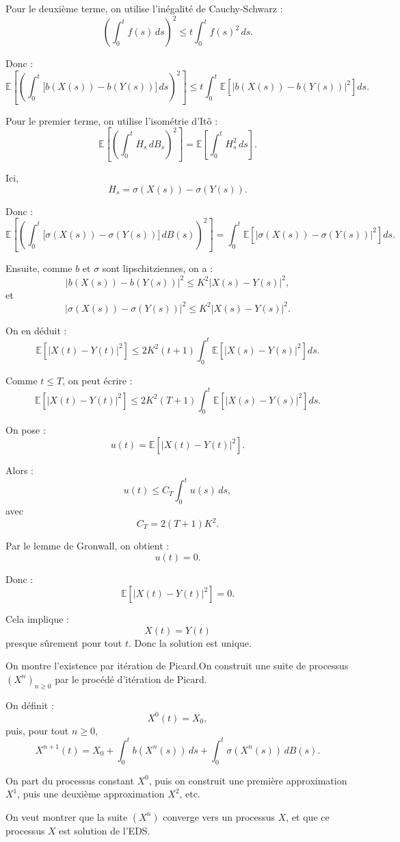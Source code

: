 \documentclass[12pt,a4paper]{article}
\theoremstyle{remark}
\begin{document}
Pour le deuxième terme, on utilise l’inégalité de Cauchy-Schwarz :
\[
\left(
\int_0^t f(s)\,ds
\right)^2
\leq
t\int_0^t f(s)^2\,ds.
\]

Donc :
\[
\mathbb{E}\left[
\left(
\int_0^t
\bigl[b(X(s))-b(Y(s))\bigr]\,ds
\right)^2
\right]
\leq
t\int_0^t
\mathbb{E}\left[
|b(X(s))-b(Y(s))|^2
\right]ds.
\]

Pour le premier terme, on utilise l’isométrie d’Itô :
\[
\mathbb{E}\left[
\left(
\int_0^t H_s\,dB_s
\right)^2
\right]
=
\mathbb{E}\left[
\int_0^t H_s^2\,ds
\right].
\]

Ici,
\[
H_s=\sigma(X(s))-\sigma(Y(s)).
\]

Donc :
\[
\mathbb{E}\left[
\left(
\int_0^t
\bigl[\sigma(X(s))-\sigma(Y(s))\bigr]\,dB(s)
\right)^2
\right]
=
\int_0^t
\mathbb{E}\left[
|\sigma(X(s))-\sigma(Y(s))|^2
\right]ds.
\]

Ensuite, comme $b$ et $\sigma$ sont lipschitziennes, on a :
\[
|b(X(s))-b(Y(s))|^2
\leq
K^2|X(s)-Y(s)|^2,
\]
et
\[
|\sigma(X(s))-\sigma(Y(s))|^2
\leq
K^2|X(s)-Y(s)|^2.
\]

On en déduit :
\[
\mathbb{E}\left[|X(t)-Y(t)|^2\right]
\leq
2K^2(t+1)
\int_0^t
\mathbb{E}\left[|X(s)-Y(s)|^2\right]ds.
\]

Comme $t \leq T$, on peut écrire :
\[
\mathbb{E}\left[|X(t)-Y(t)|^2\right]
\leq
2K^2(T+1)
\int_0^t
\mathbb{E}\left[|X(s)-Y(s)|^2\right]ds.
\]

On pose :
\[
u(t)=\mathbb{E}\left[|X(t)-Y(t)|^2\right].
\]

Alors :
\[
u(t)
\leq
C_T\int_0^t u(s)\,ds,
\]
avec
\[
C_T=2(T+1)K^2.
\]

Par le lemme de Gronwall, on obtient :
\[
u(t)=0.
\]

Donc :
\[
\mathbb{E}\left[|X(t)-Y(t)|^2\right]=0.
\]

Cela implique :
\[
X(t)=Y(t)
\]
presque sûrement pour tout $t$. Donc la solution est unique.


On montre l’existence par itération de Picard.On construit une suite de processus $(X^n)_{n \geq 0}$ par le procédé d’itération de Picard.

On définit :
\[
X^0(t)=X_0,
\]
puis, pour tout $n \geq 0$,
\[
X^{n+1}(t)
=
X_0
+
\int_0^t b(X^n(s))\,ds
+
\int_0^t \sigma(X^n(s))\,dB(s).
\]

On part du processus constant $X^0$, puis on construit une première approximation $X^1$, puis une deuxième approximation $X^2$, etc.

On veut montrer que la suite $(X^n)$ converge vers un processus $X$, et que ce processus $X$ est solution de l’EDS.
\end{document}
